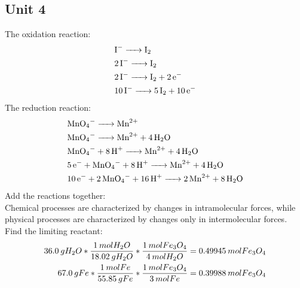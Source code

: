\documentclass{article}
\begin{document}
\subsection{Unit 4}
\AnswerSet
{}
\AnswerSet
The oxidation reaction: \\
\begin{equation*}
\begin{aligned}
& \ce{I- -> I2} \\
& \ce{2I- -> I2}\\
& \ce{2I- -> I2 + 2e-} \\
& \ce{10I- -> 5I2 + 10e-}
\end{aligned}
\end{equation*}
The reduction reaction:
\begin{equation*}
    \begin{aligned}
        & \ce{MnO4- -> Mn^{2+}} \\
        & \ce{MnO4- -> Mn^{2+} + 4H2O}\\
        & \ce{MnO4- + 8H+ -> Mn^{2+} + 4H2O} \\
        & \ce{5e- + MnO4- + 8H+ -> Mn^{2+} + 4H2O} \\
        & \ce{10e- + 2MnO4- + 16H+ -> 2Mn^{2+} + 8H2O}
    \end{aligned}
\end{equation*}
Add the reactions together: \\
\AnswerSet
{}
\AnswerSet
Chemical processes are characterized by changes in intramolecular forces, while physical processes are characterized by changes only in intermolecular forces.
\AnswerSet
Find the limiting reactant:
\begin{equation}
    \begin{split}
        36.0\hspace{0.2em}gH_{2}O * \frac{1\hspace{0.2em}molH_{2}O}{18.02\hspace{0.2em}gH_{2}O} *\frac{1\hspace{0.2em}molFe_{3}O_{4}}{4\hspace{0.2em}molH_{2}O} = 0.49945 \hspace{0.2em}mol Fe_{3}O_{4}\\
        67.0\hspace{0.2em}gFe * \frac{1\hspace{0.2em}molFe}{55.85\hspace{0.2em}gFe} * \frac{1\hspace{0.2em}mol Fe_{3}O_{4}}{3\hspace{0.2em}molFe} = 0.39988\hspace{0.2em}mol Fe_{3}O_{4}
    \end{split}
\end{equation}
\end{document}
